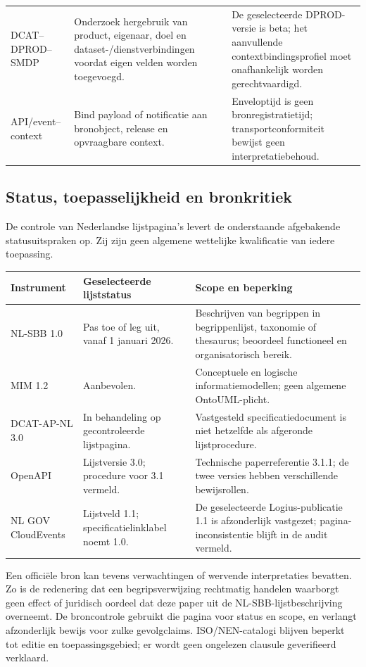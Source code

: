 \begin{longtable}{@{}P{.24\linewidth}P{.32\linewidth}P{.36\linewidth}@{}}
DCAT--DPROD--SMDP \citep{S47,S51} & Onderzoek hergebruik van product, eigenaar, doel en dataset-/dienstverbindingen voordat eigen velden worden toegevoegd. & De geselecteerde DPROD-versie is beta; het aanvullende contextbindingsprofiel moet onafhankelijk worden gerechtvaardigd. \\
API/event--context \citep{S19,S22} & Bind payload of notificatie aan bronobject, release en opvraagbare context. & Enveloptijd is geen bronregistratietijd; transportconformiteit bewijst geen interpretatiebehoud. \\
\bottomrule\end{longtable}

\subsection{Status, toepasselijkheid en bronkritiek}
De controle van Nederlandse lijstpagina’s levert de onderstaande afgebakende statusuitspraken op. Zij zijn geen algemene wettelijke kwalificatie van iedere toepassing.
\begin{longtable}{@{}P{.25\linewidth}P{.25\linewidth}P{.42\linewidth}@{}}
\toprule Instrument & Geselecteerde lijststatus & Scope en beperking \\ \midrule
NL-SBB 1.0 \citep{S14} & Pas toe of leg uit, vanaf 1 januari 2026. & Beschrijven van begrippen in begrippenlijst, taxonomie of thesaurus; beoordeel functioneel en organisatorisch bereik. \\
MIM 1.2 \citep{S13} & Aanbevolen. & Conceptuele en logische informatiemodellen; geen algemene OntoUML-plicht. \\
DCAT-AP-NL 3.0 \citep{S16} & In behandeling op gecontroleerde lijstpagina. & Vastgesteld specificatiedocument is niet hetzelfde als afgeronde lijstprocedure. \\
OpenAPI \citep{S19} & Lijstversie 3.0; procedure voor 3.1 vermeld. & Technische paperreferentie 3.1.1; de twee versies hebben verschillende bewijsrollen. \\
NL GOV CloudEvents \citep{S22} & Lijstveld 1.1; specificatielinklabel noemt 1.0. & De geselecteerde Logius-publicatie 1.1 is afzonderlijk vastgezet; pagina-inconsistentie blijft in de audit vermeld. \\
\bottomrule\end{longtable}

Een officiële bron kan tevens verwachtingen of wervende interpretaties bevatten. Zo is de redenering dat een begripsverwijzing rechtmatig handelen waarborgt geen effect of juridisch oordeel dat deze paper uit de NL-SBB-lijstbeschrijving overneemt. De broncontrole gebruikt die pagina voor status en scope, en verlangt afzonderlijk bewijs voor zulke gevolgclaims. ISO/NEN-catalogi blijven beperkt tot editie en toepassingsgebied; er wordt geen ongelezen clausule geverifieerd verklaard.
